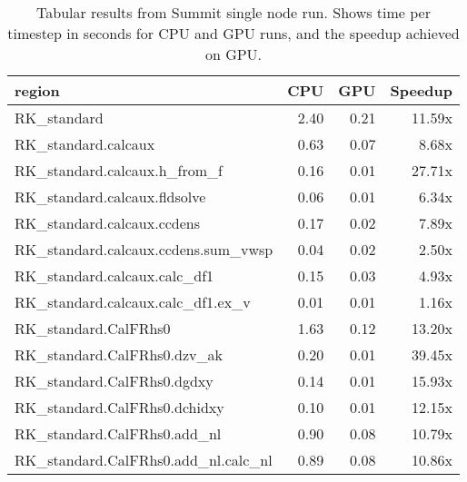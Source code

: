 \begin{table*}[htb]
  \centering
  \begin{tabular}{|l|rrr|}
  \hline
  region & CPU & GPU & Speedup \\
  \hline
  RK{\_}standard                                          &   2.40 &  0.21 & 11.59x \\
  RK{\_}standard.calcaux                                  &   0.63 &  0.07 &  8.68x \\
  RK{\_}standard.calcaux.h{\_}from{\_}f                   &   0.16 &  0.01 & 27.71x \\
  RK{\_}standard.calcaux.fldsolve                         &   0.06 &  0.01 &  6.34x \\
  RK{\_}standard.calcaux.ccdens                           &   0.17 &  0.02 &  7.89x \\
  RK{\_}standard.calcaux.ccdens.sum{\_}vwsp               &   0.04 &  0.02 &  2.50x \\
  RK{\_}standard.calcaux.calc{\_}df1                      &   0.15 &  0.03 &  4.93x \\
  RK{\_}standard.calcaux.calc{\_}df1.ex{\_}v              &   0.01 &  0.01 &  1.16x \\
  RK{\_}standard.CalFRhs0                                 &   1.63 &  0.12 & 13.20x \\
  RK{\_}standard.CalFRhs0.dzv{\_}ak                       &   0.20 &  0.01 & 39.45x \\
  RK{\_}standard.CalFRhs0.dgdxy                           &   0.14 &  0.01 & 15.93x \\
  RK{\_}standard.CalFRhs0.dchidxy                         &   0.10 &  0.01 & 12.15x \\
  RK{\_}standard.CalFRhs0.add{\_}nl                       &   0.90 &  0.08 & 10.79x \\
  RK{\_}standard.CalFRhs0.add{\_}nl.calc{\_}nl            &   0.89 &  0.08 & 10.86x \\
  \hline
  \end{tabular}
  \caption{Tabular results from Summit single node run. Shows time per timestep in seconds for CPU and GPU runs, and the speedup achieved on GPU.}
  \label{tab:single_node}
\end{table*}
